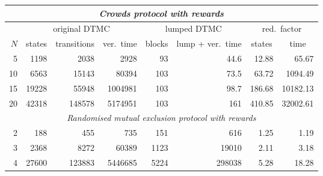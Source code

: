 \documentclass{llncs}
\begin{document}
{\scriptsize
\begin{center}
\begin{tabular}{|r|r|r|r|r|r|r|r|}
\hline 
\hline
\multicolumn{8}{|c|}{\emph{Crowds protocol with rewards}} \\ 
\hline \hline
& \multicolumn{3}{c|}{original DTMC} & \multicolumn{2}{c|}{lumped DTMC} & \multicolumn{2}{c|}{red.\ factor} \\[1ex] \hline 
  $N$        & \multicolumn{1}{c|}{states} &transitions& ver.\ time    &blocks& lump + ver.\ time& \multicolumn{1}{c|}{states} & \multicolumn{1}{c|}{time} \\ \hline

 5    & 1198      & 2038        & 2928 & 93       & 44.6    & 12.88    & 65.67    \\
 10   & 6563      & 15143       & 80394 & 103      & 73.5    & 63.72    & 1094.49  \\
 15   & 19228     & 55948       & 1004981 & 103      & 98.7    & 186.68   & 10182.13 \\
 20   & 42318     & 148578      & 5174951 & 103      & 161\phantom{.0}     & 410.85   & 32002.61 \\
\hline \hline
\multicolumn{8}{|c|}{\emph{Randomised mutual exclusion protocol with rewards}} \\
\hline \hline
 2    & 188       & 455         & 735      & 151      & 616     & 1.25     & 1.19     \\
 3    & 2368      & 8272        & 60389    & 1123     & 19010   & 2.11     & 3.18     \\
 4    & 27600     & 123883      & 5446685  & 5224     & 298038  & 5.28     & 18.28    \\

\end{tabular}
\end{center}}
\end{document}
